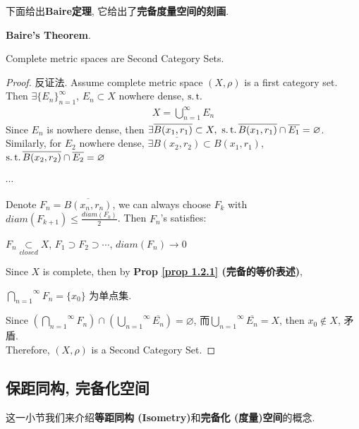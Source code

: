 	下面给出\textbf{Baire定理}, 它给出了\textbf{完备度量空间的刻画}.
	\begin{thm}\label{thm 1.2.1}
		\textbf{Baire's Theorem}. 
		\begin{center}
			Complete metric spaces are Second Category Sets.
		\end{center}
	
		\vspace{4em}
		
		\begin{proof}
			反证法. Assume complete metric space $(X , \rho)$ is a first category set. Then $\exists \{ E_n \}_{n = 1}^{\infty}$, $E_n \subset X$ nowhere dense, $\operatorname{s.t.}$
			\begin{align}
				X = \bigcup_{n = 1}^{\infty}{E_n}
			\end{align}
			Since $E_n$ is nowhere dense, then $\exists \overline{B(x_1 , r_1)} \subset X , \,\, \operatorname{s.t.} \overline{B(x_1 , r_1)} \cap \overline{E_1} = \varnothing$. \\
			Similarly, for $E_2$ nowhere dense, $\exists \overline{B(x_2 , r_2)} \subset B(x_1 , r_1)$, $\operatorname{s.t.} \overline{B(x_2 , r_2)} \cap \overline{E_2} = \varnothing$
			\begin{center}
				$\cdots$
			\end{center}
			Denote $F_n = \overline{B(x_n , r_n)}$, we can always choose $F_k$ with $diam(F_{k + 1}) \leq \frac{diam(F_k)}{2}$. Then $F_n$'s satisfies:
			\begin{center}
				$F_n \underset{closed}{\subset} X$, $F_1 \supset F_2 \supset \cdots$, $diam(F_n) \to 0$
			\end{center}
			Since $X$ is complete, then by \textbf{Prop \ref{prop 1.2.1} (完备的等价表述)},
			\begin{center}
				$\overset{\infty}{\underset{n = 1}{\bigcap}}{F_n} = \{ x_0 \}$ 为单点集.
			\end{center}
			Since $(\overset{\infty}{\underset{n = 1}{\bigcap}}{F_n}) \cap (\overset{\infty}{\underset{n = 1}{\bigcup}}{\overline{E_n}}) = \varnothing$, 而$\overset{\infty}{\underset{n = 1}{\bigcup}}{\overline{E_n}} = X$, then $x_0 \notin X$, 矛盾. \\
			Therefore, $(X , \rho)$ is a Second Category Set.
		\end{proof}
	\end{thm}

\newpage

\subsection{保距同构, 完备化空间}
	\begin{center}
		这一小节我们来介绍\textbf{等距同构 (Isometry)}和\textbf{完备化 (度量)空间}的概念.
	\end{center}

